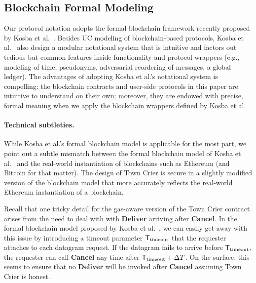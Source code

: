 \subsection{Blockchain Formal Modeling}
\label{sec:blockchainmodel}

Our protocol notation adopts the formal blockchain
framework recently proposed by Kosba et al.~\cite{hawk}.
Besides UC modeling of blockchain-based protocols, 
Kosba et al.~\cite{hawk} also 
design a modular notational system  
that is intuitive and factors out tedious but common   
features inside functionality and protocol wrappers (e.g.,
modeling of time, pseudonyms, adversarial reordering of messages, 
a global ledger).
The advantages of 
adopting Kosba et al.'s notational system is compelling:
the 
blockchain contracts and user-side protocols
in this paper are 
intuitive to understand on their own; moreover,
they are endowed with precise, formal meaning
when  we apply the blockchain wrappers defined
by Kosba et al.

\newcommand{\Ttimeout}{\ensuremath{{\sf T}_{\text{timeout}}}\xspace}

\paragraph{Technical subtleties.}
While Kosba et al.'s formal blockchain model is applicable for the most part,
we point out a subtle mismatch
between the formal blockchain model of
Kosba et al.~\cite{hawk} and
the real-world instantiation of blockchains such as 
Ethereum (and Bitcoin for that matter).
The design of Town Crier is secure in a slightly modified
version of the blockchain model that more accurately reflects
the real-world Ethereum instantiation of a blockchain.


Recall that one tricky detail for the gas-aware version of the Town Crier 
contract arises from the need to deal with  
with {\bf Deliver}
arriving after {\bf Cancel}.
In the formal blockchain model
proposed by Kosba et al.~\cite{hawk}, we can easily get away with this issue 
by introducing 
a timeout parameter
$\Ttimeout$ that the requester attaches to each datagram request. 
If the datagram fails to arrive before $\Ttimeout$, 
the requester can call {\bf Cancel}
any time after 
$\Ttimeout + \Delta T$.  
On the surface, this 
seems to ensure that no {\bf Deliver} will be invoked
after {\bf Cancel} assuming Town Crier is honest. 

